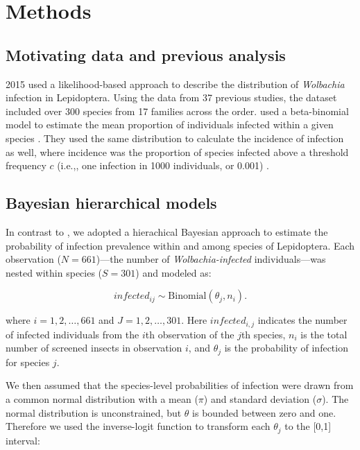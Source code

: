 \documentclass[12pt]{article}
\begin{document}
\raggedright
\setlength{\parindent}{0.3in}

\section{Methods}
\subsection{Motivating data and previous analysis}

\cite{Ahmed:2015aa} 2015 used a likelihood-based approach to describe the distribution of \emph{Wolbachia} infection in Lepidoptera. Using the data from 37 previous studies, the dataset included over 300 species from 17 families across the order. \cite{Ahmed:2015aa} used a beta-binomial model to estimate the mean proportion of individuals infected within a given species \citep{Hilgenboecker:2008aa}. They used the same distribution to calculate the incidence of infection as well, where incidence was the proportion of species infected above a threshold frequency $c$ (i.e.,, one infection in 1000 individuals, or 0.001) \citep{Weinert:2015aa}. 

\subsection{Bayesian hierarchical models}
	In contrast to \cite{Ahmed:2015aa}, we adopted a hierachical Bayesian approach to estimate the probability of infection prevalence within and among species of Lepidoptera. Each observation ($N=661$)---the number of \emph{Wolbachia-infected} individuals---was nested within species ($S=301$) and  modeled as:

\begin{equation}
	infected_{ij} \sim \mathrm{Binomial}(\theta_{j}, n_{i}).
\end{equation}

where $i = 1, 2, \ldots, 661$ and $J = 1, 2, \ldots, 301$. Here $infected_{i,j}$ indicates the number of infected individuals from the $i$th observation of the $j$th species,  $n_{i}$ is the total number of screened insects in observation $i$, and $\theta_{j}$ is the probability of infection for species $j$. 

	We then assumed that the species-level probabilities of infection were drawn from a common normal distribution with a mean ($\pi$) and standard deviation ($\sigma$). The normal distribution is unconstrained, but $\theta$ is bounded between zero and one. Therefore we used the inverse-logit function to transform each $\theta_{j}$ to the [0,1] interval: 
    
\end{document}

